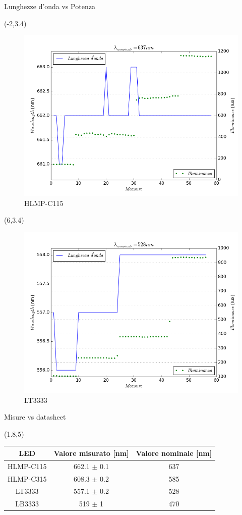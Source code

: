 \documentclass{beamer}
\begin{document}
\begin{frame}{Lunghezze d'onda vs Potenza}
\begin{textblock}{12}(-2,3.4)
\begin{figure}
\centering
\includegraphics[width=0.6\linewidth]{./wave_hlmprosso_comp}
\caption{HLMP-C115}
\label{fig:resp}
\end{figure}
\end{textblock}


\begin{textblock}{12}(6,3.4)
\begin{figure}
\includegraphics[width=0.6\linewidth]{./wave_led3333_comp}
\caption{LT3333}
\label{fig:cal}
\end{figure}
\end{textblock}
\end{frame}

\begin{frame}{Misure vs datasheet}
\begin{textblock}{11.5}(1.8,5)
\centering
\begin{tabular}{c|c|c}
LED & Valore misurato [nm] & Valore nominale [nm] \\ 
\hline 
HLMP-C115 & 662.1 $\pm$ 0.1 & 637 \\ 
\hline 
HLMP-C315 & 608.3 $\pm$ 0.2 & 585 \\ 
\hline 
LT3333 & 557.1 $\pm$ 0.2 & 528 \\ 
\hline 
LB3333 & 519 $\pm$ 1 & 470 \\
\end{tabular} 
\end{textblock}
\end{frame}
\end{document}
